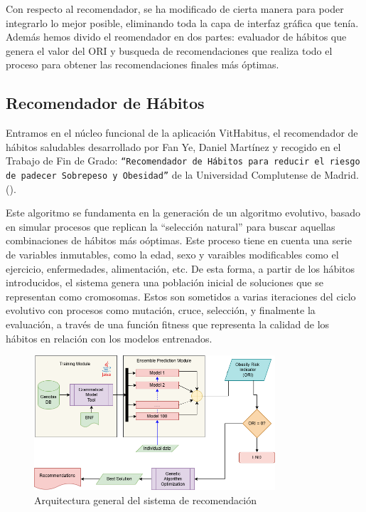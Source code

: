 Con respecto al recomendador, se ha modificado de cierta manera para poder integrarlo lo mejor posible, eliminando toda la capa de interfaz gráfica que tenía. Además hemos divido el reomendador en dos partes: evaluador de hábitos que genera el valor del ORI y busqueda de recomendaciones que realiza todo el proceso para obtener las recomendaciones finales más óptimas.

\subsection{Recomendador de Hábitos}

Entramos en el núcleo funcional de la aplicación VitHabitus, el recomendador de hábitos saludables desarrollado por Fan Ye, Daniel Martínez y recogido en el Trabajo de Fin de Grado: \texttt{``Recomendador de Hábitos para reducir el riesgo
de padecer Sobrepeso y Obesidad''} de la Universidad Complutense de Madrid. (\cite{tfg_recomendador}).

Este algoritmo se fundamenta en la generación de un algoritmo evolutivo, basado en simular procesos que replican la ``selección natural'' para buscar aquellas combinaciones de hábitos más oóptimas.
Este proceso tiene en cuenta una serie de variables inmutables, como la edad, sexo y varaibles modificables como el ejercicio, enfermedades, alimentación, etc.
De esta forma, a partir de los hábitos introducidos, el sistema genera una población inicial de soluciones que se representan como cromosomas. Estos son sometidos a varias iteraciones del ciclo evolutivo con procesos como mutación, cruce, selección, y finalmente la evaluación, a través de una función fitness que representa la calidad de los hábitos en relación con los modelos entrenados.

\begin{figure}[h]
	\centering
	\includegraphics[width = 0.8\textwidth]{Imagenes/esquemas/ObesityRiskIndicator.drawio.png}
	\caption{Arquitectura general del sistema de recomendación}
	\label{fig:Recommendersqueme}
\end{figure}

